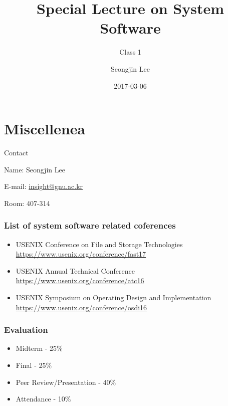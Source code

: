 \documentclass[newPxFont,sthlmFooter,nooffset]{beamer}
\title{Special Lecture on System Software}
\subtitle{Class 1}
\author[SJL]{Seongjin Lee}
\institute{\href{mailto:insight@gnu.ac.kr}{insight@gnu.ac.kr}\\\url{http://resourceful.github.io}\\Systems Research Lab.\\GNU}
\date{2017-03-06}
\begin{document}
\frame[plain,t]{\titlepage} 



\section{Miscellenea} 


\begin{frame}[t]{Contact}

Name: Seongjin Lee

E-mail: \url{insight@gnu.ac.kr}

Room: 407-314




\end{frame}


\begin{frame}
  \frametitle{List of system software related coferences}
  \begin{itemize}
  \item USENIX Conference on File and Storage Technologies \url{https://www.usenix.org/conference/fast17}
  \item USENIX Annual Technical Conference \url{https://www.usenix.org/conference/atc16}
  \item USENIX Symposium on Operating Design and Implementation \url{https://www.usenix.org/conference/osdi16}
  \end{itemize}
\end{frame}



\begin{frame}[t]
  \frametitle{Evaluation}
  \begin{itemize}
  \item Midterm - 25$\%$
  \item Final - 25$\%$
  \item Peer Review/Presentation - 40$\%$ 
  \item Attendance - 10$\%$
  \end{itemize}
\end{frame}
\end{document}
